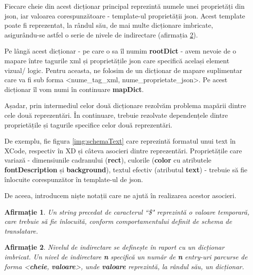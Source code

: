 Fiecare cheie din acest dicționar principal reprezintă numele unei proprietăți din json, iar valoarea corespunzătoare - template-ul proprietății json.  Acest template poate fi reprezentat, la rândul său, de mai multe dicționare imbricate, asigurându-se astfel o serie de nivele de indirectare (afirmația \ref{nivel}).

Pe lângă acest dicționar - pe care o sa îl numim \textbf{rootDict} - avem nevoie de o mapare între tagurile xml și proprietățile json care specifică același element vizual/ logic. Pentru aceasta, ne folosim de un dicționar de mapare suplimentar care va fi sub forma <nume_tag_xml,  nume_proprietate_json>. Pe acest dicționar îl vom numi în continuare \textbf{mapDict}.

Așadar, prin intermediul celor două dicționare rezolvăm problema mapării dintre cele două reprezentări. 
În continuare, trebuie rezolvate dependențele dintre proprietățile și tagurile specifice celor două reprezentări.




De exemplu, fie figura \ref{img:schemaText} care reprezintă formatul unui text în XCode, respectiv în XD și câteva asocieri dintre reprezentări.
Proprietățile care variază - dimensiunile cadranului (\textbf{rect}), culorile (\textbf{color} cu atributele \textbf{fontDescription} și \textbf{background}), textul efectiv (atributul \textbf{text}) - trebuie să fie înlocuite corespunzător în template-ul de json.


De aceea, introducem niște notații care ne ajută în realizarea acestor asocieri. 
\\

\newtheorem{mydef}{Afirmație}[chapter]
\newtheorem{myNote}{Notă}[chapter]

\begin{mydef}\label{dollar}
Un string precedat de caracterul ``\$" reprezintă o valoare temporară, care trebuie să fie înlocuită, conform comportamentului definit de schema de translatare.\\
\end{mydef}


\begin{mydef}\label{nivel}
Nivelul de indirectare se definește în raport cu un dicționar imbricat. Un nivel de indirectare \textbf{n} specifică un număr de \textbf{n} entry-uri parcurse de forma <\textbf{cheie}, \textbf{valoare}>, unde \textbf{valoare} reprezintă, la rândul său, un dicționar.\\
\end{mydef}


